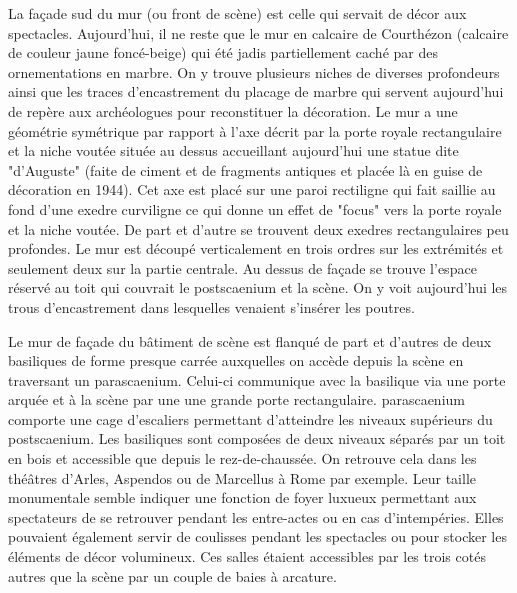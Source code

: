 		La façade sud du mur (ou front de scène) est celle qui servait de décor aux spectacles. Aujourd'hui, il ne reste que le mur en calcaire de Courthézon (calcaire de couleur jaune foncé-beige) qui été jadis partiellement caché par des ornementations en marbre. On y trouve plusieurs niches de diverses profondeurs ainsi que les traces d'encastrement du placage de marbre qui servent aujourd'hui de repère aux archéologues pour reconstituer la décoration. Le mur a une géométrie symétrique par rapport à l'axe décrit par la porte royale rectangulaire et la niche voutée située au dessus accueillant aujourd'hui une statue dite "d'Auguste" (faite de ciment et de fragments antiques et placée là en guise de décoration en 1944). Cet axe est placé sur une paroi rectiligne qui fait saillie au fond d'une \gls{exedre} curviligne ce qui donne un effet de "focus" vers la porte royale et la niche voutée. De part et d'autre se trouvent deux \glspl{exedre} rectangulaires peu profondes. Le mur est découpé verticalement en trois ordres sur les extrémités et seulement deux sur la partie centrale. Au dessus de façade se trouve l'espace réservé au toit qui couvrait le \gls{postscaenium} et la scène. On y voit aujourd'hui les trous d'encastrement dans lesquelles venaient s'insérer les poutres.
		
		Le mur de façade du bâtiment de scène est flanqué de part et d'autres de deux \glspl{basilique} de forme presque carrée auxquelles on accède depuis la scène en traversant un \gls{parascaenium}. Celui-ci communique avec la basilique via une porte arquée et à la scène par une une grande porte rectangulaire. \gls{parascaenium} comporte une cage d'escaliers permettant d'atteindre les niveaux supérieurs du \gls{postscaenium}. Les \glspl{basilique} sont composées de deux niveaux séparés par un toit en bois et accessible que depuis le rez-de-chaussée. On retrouve cela dans les théâtres d'Arles, Aspendos ou de Marcellus à Rome par exemple. Leur taille monumentale semble indiquer une fonction de foyer luxueux permettant aux spectateurs de se retrouver pendant les entre-actes ou en cas d'intempéries. Elles pouvaient également servir de coulisses pendant les spectacles ou pour stocker les éléments de décor volumineux. Ces salles étaient accessibles par les trois cotés autres que la scène par un couple de baies à arcature. 
				
